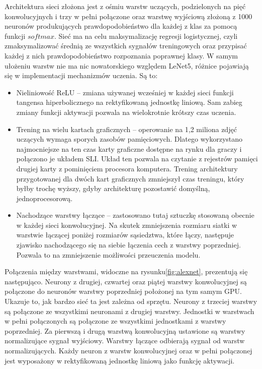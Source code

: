 \documentclass[12pt,a4paper,twoside,titlepage,openright]{book}
\begin{document}
\begin{itemize}
 Architektura sieci złożona jest z ośmiu warstw uczących, podzielonych na pięć konwolucyjnych i trzy w pełni połączone oraz warstwę wyjściową złożoną z 1000 neuronów produkujących prawdopodobieństwo dla każdej z klas za pomocą funkcji $softmax$. Sieć ma na celu maksymalizację regresji logistycznej, czyli zmaksymalizować średnią ze wszystkich sygnałów treningowych oraz przypisać każdej z nich prawdopodobieństwo rozpoznania poprawnej klasy.
  W samym ułożeniu warstw nie ma nic nowatorskiego względem LeNet5, różnice pojawiają się w implementacji mechanizmów uczenia. Są to:
 \begin{itemize}
 \item Nieliniowość ReLU -- zmiana używanej wcześniej w każdej sieci funkcji tangensa hiperbolicznego na rektyfikowaną jednostkę liniową. Sam zabieg zmiany funkcji aktywacji pozwala na wielokrotnie krótszy czas uczenia.
 \item Trening na wielu kartach graficznych -- operowanie na 1,2 miliona zdjęć uczących wymaga sporych zasobów pamięciowych. Dlatego wykorzystano najmocniejsze na ten czas karty graficzne dostępne na rynku dla graczy i połączono je układem SLI. Układ ten pozwala na czytanie z rejestrów pamięci drugiej karty z pominięciem procesora komputera. Trening architektury przygotowanej dla dwóch kart graficznych zmniejszył czas treningu, który byłby trochę wyższy, gdyby architekturę pozostawić domyślną, jednoprocesorową.
 \item Nachodzące warstwy łączące -- zastosowano tutaj sztuczkę stosowaną obecnie w każdej sieci konwolucyjnej. Na skutek zmniejszenia rozmiaru siatki w warstwie łączącej poniżej rozmiarów sąsiedztwa, które łączy, następuje zjawisko nachodzącego się na siebie łączenia cech z warstwy poprzedniej. Pozwala to na zmniejszenie możliwości przeuczenia modelu.
 \end{itemize}
 
 Połączenia między warstwami, widoczne na rysunku\ref{fig:alexnet}, prezentują się następująco. Neurony z drugiej, czwartej oraz piątej warstwy konwolucyjnej są połączone do neuronów warstwy poprzedniej położonej na tym samym GPU. Ukazuje to, jak bardzo sieć ta jest zależna od sprzętu. Neurony z trzeciej warstwy są połączone ze wszystkimi neuronami z drugiej warstwy. Jednostki w warstwach w pełni połączonych są połączone ze wszystkimi jednostkami z warstwy poprzedniej. Za pierwszą i drugą warstwą konwolucyjną ustawione są warstwy normalizujące sygnał wyjściowy. Warstwy łączące odbierają sygnał od warstw normalizujących. Każdy neuron z warstw konwolucyjnej oraz w pełni połączonej jest wyposażony w rektyfikowaną jednostkę liniową jako funkcję aktywacji.


\end{itemize}
\end{document}
